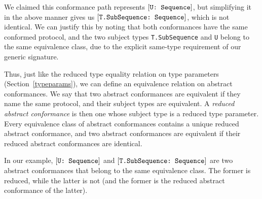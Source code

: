 \documentclass[../generics]{subfiles}
\begin{document}
We claimed this conformance path represents $[\texttt{U:~Sequence}]$, but simplifying it in the above manner gives us $[\texttt{T.SubSequence:~Sequence}]$, which is not identical. We can justify this by noting that both conformances have the same conformed protocol, and the two subject types \texttt{T.SubSequence} and \texttt{U} belong to the same equivalence class, due to the explicit same-type requirement of our generic signature.

Thus, just like the reduced type equality relation on type parameters (Section~\ref{typeparams}), we can define an equivalence relation on abstract conformances. We say that two abstract conformances are equivalent if they name the same protocol, and their subject types are equivalent. A \emph{reduced abstract conformance} is then one whose subject type is a reduced type parameter. Every equivalence class of abstract conformances contains a unique reduced abstract conformance, and two abstract conformances are equivalent if their reduced abstract conformances are identical.

In our example, $[\texttt{U:~Sequence}]$ and $[\texttt{T.SubSequence:~Sequence}]$ are two abstract conformances that belong to the same equivalence class. The former is reduced, while the latter is not (and the former is the reduced abstract conformance of the latter).
\end{document}
